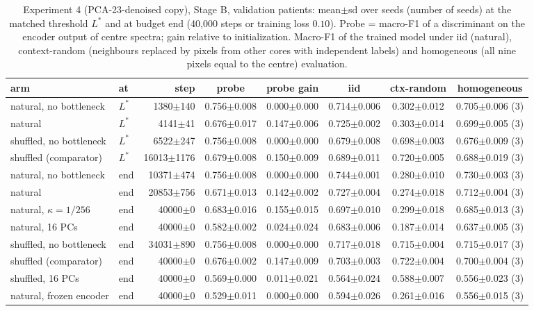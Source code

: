 \begin{table}[htbp]\centering\scriptsize
\caption{Experiment 4 (PCA-23-denoised copy), Stage B, validation patients: mean$\pm$sd over seeds (number of seeds) at the matched threshold $L^\ast$ and at budget end (40{,}000 steps or training loss $0.10$). Probe = macro-F1 of a discriminant on the encoder output of centre spectra; gain relative to initialization. Macro-F1 of the trained model under iid (natural), context-random (neighbours replaced by pixels from other cores with independent labels) and homogeneous (all nine pixels equal to the centre) evaluation.}\label{tab:exp4_val_pca23}
\begin{tabular}{llrccccc}\toprule
arm & at & step & probe & probe gain & iid & ctx-random & homogeneous \\ \midrule
natural, no bottleneck & $L^\ast$ & 1380$\pm$140 & 0.756$\pm$0.008 & 0.000$\pm$0.000 & 0.714$\pm$0.006 & 0.302$\pm$0.012 & 0.705$\pm$0.006 (3) \\
natural & $L^\ast$ & 4141$\pm$41 & 0.676$\pm$0.017 & 0.147$\pm$0.006 & 0.725$\pm$0.002 & 0.303$\pm$0.014 & 0.699$\pm$0.005 (3) \\
shuffled, no bottleneck & $L^\ast$ & 6522$\pm$247 & 0.756$\pm$0.008 & 0.000$\pm$0.000 & 0.679$\pm$0.008 & 0.698$\pm$0.003 & 0.676$\pm$0.009 (3) \\
shuffled (comparator) & $L^\ast$ & 16013$\pm$1176 & 0.679$\pm$0.008 & 0.150$\pm$0.009 & 0.689$\pm$0.011 & 0.720$\pm$0.005 & 0.688$\pm$0.019 (3) \\
\midrule
natural, no bottleneck & end & 10371$\pm$474 & 0.756$\pm$0.008 & 0.000$\pm$0.000 & 0.744$\pm$0.001 & 0.280$\pm$0.010 & 0.730$\pm$0.003 (3) \\
natural & end & 20853$\pm$756 & 0.671$\pm$0.013 & 0.142$\pm$0.002 & 0.727$\pm$0.004 & 0.274$\pm$0.018 & 0.712$\pm$0.004 (3) \\
natural, $\kappa=1/256$ & end & 40000$\pm$0 & 0.683$\pm$0.016 & 0.155$\pm$0.015 & 0.697$\pm$0.010 & 0.299$\pm$0.018 & 0.685$\pm$0.013 (3) \\
natural, 16 PCs & end & 40000$\pm$0 & 0.582$\pm$0.002 & 0.024$\pm$0.024 & 0.683$\pm$0.006 & 0.187$\pm$0.014 & 0.637$\pm$0.005 (3) \\
shuffled, no bottleneck & end & 34031$\pm$890 & 0.756$\pm$0.008 & 0.000$\pm$0.000 & 0.717$\pm$0.018 & 0.715$\pm$0.004 & 0.715$\pm$0.017 (3) \\
shuffled (comparator) & end & 40000$\pm$0 & 0.676$\pm$0.002 & 0.147$\pm$0.009 & 0.703$\pm$0.003 & 0.722$\pm$0.004 & 0.700$\pm$0.004 (3) \\
shuffled, 16 PCs & end & 40000$\pm$0 & 0.569$\pm$0.000 & 0.011$\pm$0.021 & 0.564$\pm$0.024 & 0.588$\pm$0.007 & 0.556$\pm$0.023 (3) \\
natural, frozen encoder & end & 40000$\pm$0 & 0.529$\pm$0.011 & 0.000$\pm$0.000 & 0.594$\pm$0.026 & 0.261$\pm$0.016 & 0.556$\pm$0.015 (3) \\
\bottomrule
\end{tabular}\end{table}
